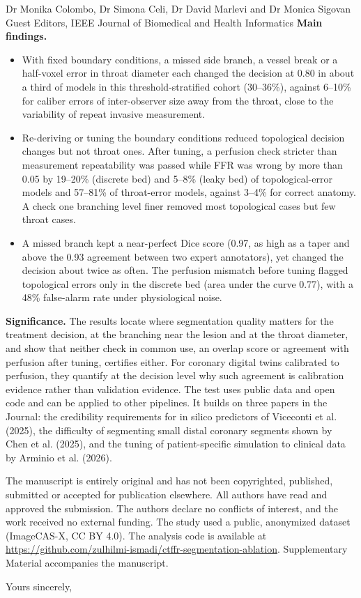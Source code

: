\documentclass[10pt]{letter}
\begin{document}
\begin{letter}{Dr Monika Colombo, Dr Simona Celi, Dr David Marlevi and Dr Monica Sigovan\\Guest Editors, IEEE Journal of Biomedical and Health Informatics}
\textbf{Main findings.}
\begin{itemize}
\item With fixed boundary conditions, a missed side branch, a vessel break or a half-voxel error in throat diameter
each changed the decision at 0.80 in about a third of models in this threshold-stratified cohort (30--36\%), against
6--10\% for caliber errors of inter-observer size away from the throat, close to the variability of repeat invasive
measurement.
\item Re-deriving or tuning the boundary conditions reduced topological decision changes but not throat ones. After
tuning, a perfusion check stricter than measurement repeatability was passed while FFR was wrong by more than 0.05 by
19--20\% (discrete bed) and 5--8\% (leaky bed) of topological-error models and 57--81\% of throat-error models,
against 3--4\% for correct anatomy. A check one branching level finer removed most topological cases but few throat
cases.
\item A missed branch kept a near-perfect Dice score (0.97, as high as a taper and above the 0.93 agreement between two
expert annotators), yet changed the decision about twice as often. The perfusion mismatch before tuning flagged topological errors only in the discrete bed (area
under the curve 0.77), with a 48\% false-alarm rate under physiological noise.
\end{itemize}

\textbf{Significance.} The results locate where segmentation quality matters for the treatment decision, at the
branching near the lesion and at the throat diameter, and show that neither check in common use, an overlap score or
agreement with perfusion after tuning, certifies either. For coronary digital twins calibrated to perfusion, they
quantify at the decision level why such agreement is calibration evidence rather than validation evidence. The test uses public data and open code and can be applied to other pipelines. It builds on three papers in the Journal: the credibility requirements for in silico predictors of
Viceconti et al. (2025), the difficulty of segmenting small distal coronary segments shown by Chen et al. (2025), and
the tuning of patient-specific simulation to clinical data by Arminio et al. (2026).

The manuscript is entirely original and has not been copyrighted, published, submitted or accepted for publication
elsewhere. All authors have read
and approved the submission. The authors declare no conflicts of interest, and the work received no external funding.
The study used a public, anonymized dataset (ImageCAS-X, CC BY 4.0). The analysis code is available at \url{https://github.com/zulhilmi-ismadi/ctffr-segmentation-ablation}. Supplementary Material accompanies the manuscript.

\closing{Yours sincerely,}
\end{letter}
\end{document}

